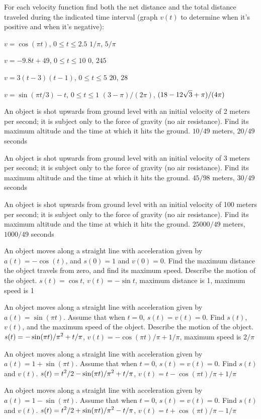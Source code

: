 For each velocity function find both the net distance and the total
distance traveled during the indicated time interval (graph $v(t)$ to
determine when it's positive and when it's negative): 

\exercise $v=\cos(\pi t)$, $0\le t\le 2.5$
\answer $1/\pi$, $5/\pi$
\endanswer
\endexercise

\exercise $v=-9.8t+49$, $0\le t\le 10$
\answer $0$, $245$
\endanswer
\endexercise

\exercise $v=3(t-3)(t-1)$, $0\le t\le 5$
\answer $20$, $28$
\endanswer
\endexercise

\exercise $v=\sin(\pi t/3)-t$, $0\le t\le 1$
\answer $(3-\pi)/(2\pi)$, $\displaystyle (18-12\sqrt3+\pi)/(4\pi)$
\endanswer
\endexercise

\exercise An object is shot upwards from ground level with an initial
velocity of 2 meters per second; it is subject only to the force of
gravity (no air resistance). Find its maximum altitude and the time at
which it hits the ground.
\answer $10/49$ meters, $20/49$ seconds
\endanswer
\endexercise

\exercise An object is shot upwards from ground level with an initial
velocity of 3 meters per second; it is subject only to the force of
gravity (no air resistance). Find its maximum altitude and the time at
which it hits the ground.
\answer $45/98$ meters, $30/49$ seconds
\endanswer
\endexercise

\exercise An object is shot upwards from ground level with an initial
velocity of 100 meters per second; it is subject only to the force of
gravity (no air resistance). Find its maximum altitude and the time at
which it hits the ground.
\answer $25000/49$ meters, $1000/49$ seconds
\endanswer
\endexercise

\exercise An object moves along a straight line with acceleration given by
$a(t) = -\cos(t)$, and $s(0)=1$ and
$v(0)=0$. Find the maximum distance the object travels from zero, and
find its maximum speed. Describe the motion of the object.
\answer $s(t)=\cos t$, $v(t)=-\sin t$,\hfill\break
maximum distance is 1,\hfill\break 
maximum speed is 1
\endanswer
\endexercise

\exercise An object moves along a straight line with acceleration given by
$a(t) = \sin(\pi t)$. Assume that when $t=0$, $s(t)=v(t)=0$. Find
$s(t)$, $v(t)$, and the maximum speed of the object. Describe the
motion of the object.
\answer $\displaystyle s(t)=-\sin(\pi t)/\pi^2+t/\pi$,\hfill\break
 $v(t)=-\cos(\pi t)/\pi+1/\pi$,\hfill\break
maximum speed is $2/\pi$
\endanswer
\endexercise

\exercise An object moves along a straight line with acceleration given by
$a(t) = 1+\sin(\pi t)$. Assume that when $t=0$, $s(t)=v(t)=0$. Find
$s(t)$ and $v(t)$.
\answer $\displaystyle s(t)=t^2/2-\sin(\pi t)/\pi^2+t/\pi$,\hfill\break
 $v(t)=t-\cos(\pi t)/\pi+1/\pi$
\endanswer
\endexercise

\exercise An object moves along a straight line with acceleration given by
$a(t) = 1-\sin(\pi t)$. Assume that when $t=0$, $s(t)=v(t)=0$. Find
$s(t)$ and $v(t)$.
\answer $\displaystyle s(t)=t^2/2+\sin(\pi t)/\pi^2-t/\pi$,\hfill\break
 $v(t)=t+\cos(\pi t)/\pi-1/\pi$
\endanswer
\endexercise

\endexercises

